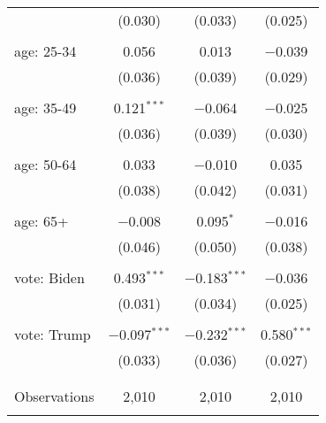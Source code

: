 \begin{tabular}{@{\extracolsep{5pt}}lccc}
  & (0.030) & (0.033) & (0.025) \\ 
  & & & \\ 
 age: 25-34 & 0.056 & 0.013 & $-$0.039 \\ 
  & (0.036) & (0.039) & (0.029) \\ 
  & & & \\ 
 age: 35-49 & 0.121$^{***}$ & $-$0.064 & $-$0.025 \\ 
  & (0.036) & (0.039) & (0.030) \\ 
  & & & \\ 
 age: 50-64 & 0.033 & $-$0.010 & 0.035 \\ 
  & (0.038) & (0.042) & (0.031) \\ 
  & & & \\ 
 age: 65+ & $-$0.008 & 0.095$^{*}$ & $-$0.016 \\ 
  & (0.046) & (0.050) & (0.038) \\ 
  & & & \\ 
 vote: Biden & 0.493$^{***}$ & $-$0.183$^{***}$ & $-$0.036 \\ 
  & (0.031) & (0.034) & (0.025) \\ 
  & & & \\ 
 vote: Trump & $-$0.097$^{***}$ & $-$0.232$^{***}$ & 0.580$^{***}$ \\ 
  & (0.033) & (0.036) & (0.027) \\ 
  & & & \\ 
\hline \\[-1.8ex] 

Observations & 2,010 & 2,010 & 2,010 \\ 
\hline 
\hline \\[-1.8ex] 
\end{tabular} 
